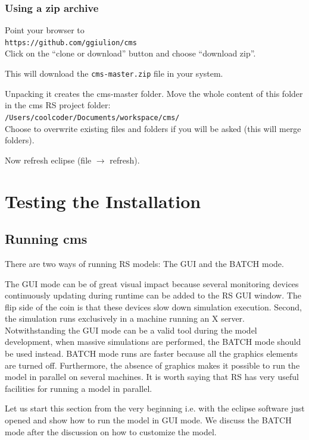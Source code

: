\documentclass{article}
\begin{document}
\vskip2mm

\subsubsection{Using a zip archive}

Point your browser to\\ 
\verb+https://github.com/ggiulion/cms+\\
Click on the ``clone or download'' button and choose ``download zip''.

This will download the \verb+cms-master.zip+ file in your system.

Unpacking it creates the cms-master folder.
Move the whole content of this folder in the cms RS project folder:\\  
\verb+/Users/coolcoder/Documents/workspace/cms/+\\
Choose to overwrite existing files and folders if you will be asked (this will merge folders). 

Now refresh eclipse (file $\rightarrow$ refresh).



\section{Testing the Installation}
\subsection{Running cms}


There are two ways of running RS models: The GUI and the BATCH mode.

The GUI mode can be of great visual impact because several monitoring devices continuously updating during runtime can be added to the RS GUI window. The flip side of the coin is that these devices slow down simulation execution. Second, the simulation runs exclusively in a machine running an X server. Notwithstanding the GUI mode can be a valid tool during the model development, when massive simulations are performed, the BATCH mode should be used instead. BATCH mode runs are faster because all the graphics elements are turned off. Furthermore, the absence of graphics makes it possible to run the model in parallel on several machines. It is worth saying that RS has very useful facilities for running a model in parallel.


Let us start this section from the very beginning i.e. with the eclipse software just opened and show how to run the model in GUI mode. 
We discuss the BATCH mode after the discussion on how to customize the model.
\end{document}
